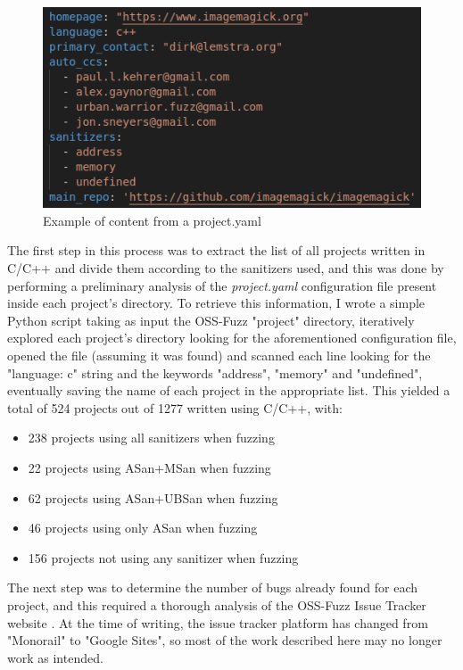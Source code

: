 \begin{figure}[h]
\centering
\includegraphics[scale=0.5]{foto/project_yaml.png}
\caption{Example of content from a project.yaml}
\label{fig:project_yaml}
\end{figure}

The first step in this process was to extract the list of all projects written in C/C++ and divide them according to the sanitizers used, and this was done by performing a preliminary analysis of the \textit{project.yaml} configuration file present inside each project's directory. To retrieve this information, I wrote a simple Python script taking as input the OSS-Fuzz "project" directory, iteratively explored each project's directory looking for the aforementioned configuration file, opened the file (assuming it was found) and scanned each line looking for the "language: c" string and the keywords "address", "memory" and "undefined", eventually saving the name of each project in the appropriate list.
\newline \newline
This yielded a total of 524 projects out of 1277 written using C/C++, with: 
\begin{itemize}
    \item 238 projects using all sanitizers when fuzzing
    \item 22 projects using ASan+MSan when fuzzing
    \item 62 projects using ASan+UBSan when fuzzing
    \item 46 projects using only ASan when fuzzing
    \item 156 projects not using any sanitizer when fuzzing
\end{itemize}

The next step was to determine the number of bugs already found for each project, and this required a thorough analysis of the OSS-Fuzz Issue Tracker website \cite{ossfuzz_bugtracker}. At the time of writing, the issue tracker platform has changed from "Monorail" to "Google Sites", so most of the work described here may no longer work as intended.

